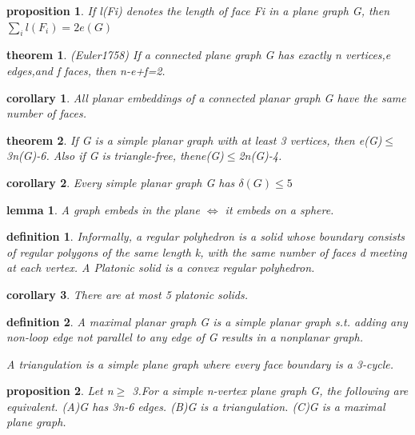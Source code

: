 \documentclass[twocolumn]{article}
\newtheorem{theorem}{theorem}[section]  %
\newtheorem{definition}{definition}
\newtheorem{proposition}{proposition}
\newtheorem{lemma}{lemma}
\newtheorem{corollary}{corollary}
\begin{document}
\begin{CJK*}{UTF8}{bkai}
    \begin{proposition}
        If l(Fi) denotes the length of face Fi in a plane graph G, then
        $\sum_{i} l(F_{i}) = 2 e(G)$
    \end{proposition}

    \begin{theorem}{(Euler1758)}
        If a connected plane graph G has exactly n vertices,e edges,and f faces, then
 n-e+f=2.
    \end{theorem}

    \begin{corollary}
        All planar embeddings of a connected planar graph G have the same number of
 faces.
    \end{corollary}

    \begin{theorem}
        If G is a simple planar graph with at least 3 vertices, then e(G)$\leq$3n(G)-6.
 Also if G is triangle-free, thene(G)$\leq$2n(G)-4.
    \end{theorem}

    \begin{corollary}
        Every simple planar graph G has $\delta(G) \leq 5$
    \end{corollary}

    \begin{lemma}
        A graph embeds in the plane $\iff$ it embeds on a sphere.
    \end{lemma}

    \begin{definition}
         Informally, a regular polyhedron is a solid whose boundary consists of regular
 polygons of the same length k, with the same number of faces d meeting at
 each vertex. A Platonic solid is a convex regular polyhedron.
    \end{definition}

    \begin{corollary}
        There are at most 5 platonic solids.
    \end{corollary}

    \begin{definition}
        A maximal planar graph G is a simple planar graph s.t. adding any non-loop
 edge not parallel to any edge of G results in a nonplanar graph.
 
 A triangulation is a simple plane graph where every face boundary is a 3-cycle.
    \end{definition}
    \begin{proposition}
         Let n$\geq$ 3.For a simple n-vertex plane graph G, the following are equivalent.
 (A)G has 3n-6 edges.
 (B)G is a triangulation.
 (C)G is a maximal plane graph.
    \end{proposition}


\end{CJK*}
\end{document}
